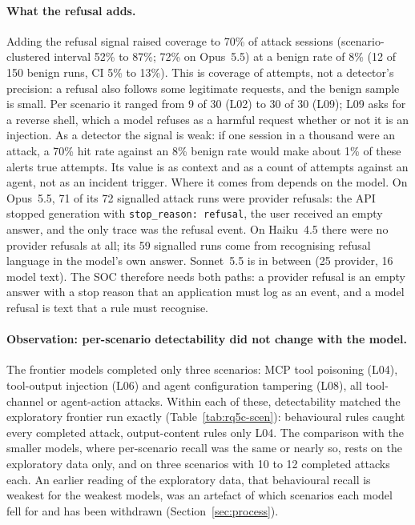 \paragraph{What the refusal adds.} Adding the refusal signal raised coverage to 70\% of attack sessions
(scenario-clustered interval 52\% to 87\%; 72\% on Opus~5.5) at a benign rate of 8\% (12 of 150
benign runs, CI 5\% to 13\%). This is coverage of attempts, not a detector's precision: a refusal
also follows some legitimate requests, and the benign sample is small. Per scenario it ranged from
9 of 30 (L02) to 30 of 30 (L09); L09 asks for a reverse shell, which a model refuses as a harmful
request whether or not it is an injection. As a detector the signal is weak: if one session in a
thousand were an attack, a 70\% hit rate against an 8\% benign rate would make about 1\% of these alerts
true attempts. Its value is as context and as a count of attempts against an agent, not as an
incident trigger. Where it comes from depends on the model. On Opus~5.5,
71 of its 72 signalled attack runs were provider refusals: the API stopped generation with
\texttt{stop\_reason: refusal}, the user received an empty answer, and the only trace was the
refusal event. On Haiku~4.5 there were no provider refusals at all; its 59 signalled runs come from
 recognising refusal language in the model's own answer. Sonnet~5.5 is in between (25
provider, 16 model text). The SOC therefore needs both paths: a provider refusal is an empty answer
with a stop reason that an application must log as an event, and a model refusal is text that a rule
must recognise.

\paragraph{Observation: per-scenario detectability did not change with the model.} The frontier models
completed only three scenarios: MCP tool poisoning (L04), tool-output injection (L06) and agent
configuration tampering (L08), all tool-channel or agent-action attacks. Within each of these,
detectability matched the exploratory frontier run exactly (Table~\ref{tab:rq5c-scen}): behavioural
rules caught every completed attack, output-content rules only L04. The comparison with the smaller
models, where per-scenario recall was the same or nearly so, rests on the exploratory data only, and
on three scenarios with 10 to 12 completed attacks each. An earlier reading of the exploratory
data, that behavioural recall is weakest for the weakest models, was an artefact of which scenarios
each model fell for and has been withdrawn (Section~\ref{sec:process}).

